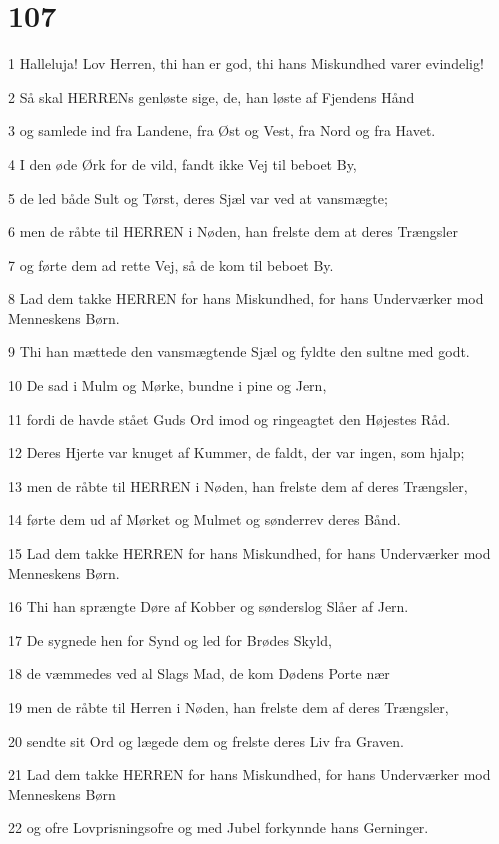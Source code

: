 \chapter{107}

\par 1 Halleluja! Lov Herren, thi han er god, thi hans Miskundhed varer evindelig!
\par 2 Så skal HERRENs genløste sige, de, han løste af Fjendens Hånd
\par 3 og samlede ind fra Landene, fra Øst og Vest, fra Nord og fra Havet.
\par 4 I den øde Ørk for de vild, fandt ikke Vej til beboet By,
\par 5 de led både Sult og Tørst, deres Sjæl var ved at vansmægte;
\par 6 men de råbte til HERREN i Nøden, han frelste dem at deres Trængsler
\par 7 og førte dem ad rette Vej, så de kom til beboet By.
\par 8 Lad dem takke HERREN for hans Miskundhed, for hans Underværker mod Menneskens Børn.
\par 9 Thi han mættede den vansmægtende Sjæl og fyldte den sultne med godt.
\par 10 De sad i Mulm og Mørke, bundne i pine og Jern,
\par 11 fordi de havde stået Guds Ord imod og ringeagtet den Højestes Råd.
\par 12 Deres Hjerte var knuget af Kummer, de faldt, der var ingen, som hjalp;
\par 13 men de råbte til HERREN i Nøden, han frelste dem af deres Trængsler,
\par 14 førte dem ud af Mørket og Mulmet og sønderrev deres Bånd.
\par 15 Lad dem takke HERREN for hans Miskundhed, for hans Underværker mod Menneskens Børn.
\par 16 Thi han sprængte Døre af Kobber og sønderslog Slåer af Jern.
\par 17 De sygnede hen for Synd og led for Brødes Skyld,
\par 18 de væmmedes ved al Slags Mad, de kom Dødens Porte nær
\par 19 men de råbte til Herren i Nøden, han frelste dem af deres Trængsler,
\par 20 sendte sit Ord og lægede dem og frelste deres Liv fra Graven.
\par 21 Lad dem takke HERREN for hans Miskundhed, for hans Underværker mod Menneskens Børn
\par 22 og ofre Lovprisningsofre og med Jubel forkynnde hans Gerninger.

